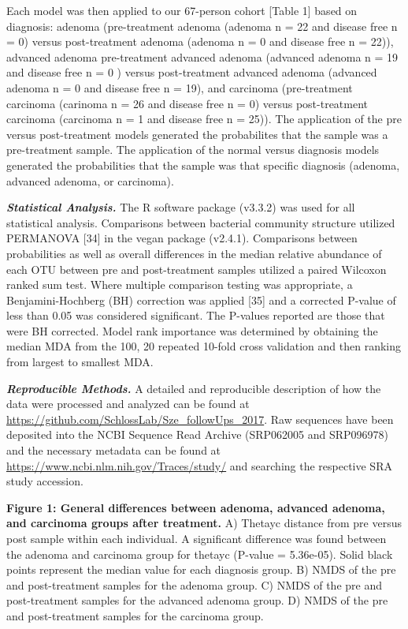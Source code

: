 \documentclass[12pt,]{article}
\begin{document}
Each model was then applied to our 67-person cohort {[}Table 1{]} based
on diagnosis: adenoma (pre-treatment adenoma (adenoma n = 22 and disease
free n = 0) versus post-treatment adenoma (adenoma n = 0 and disease
free n = 22)), advanced adenoma pre-treatment advanced adenoma (advanced
adenoma n = 19 and disease free n = 0 ) versus post-treatment advanced
adenoma (advanced adenoma n = 0 and disease free n = 19), and carcinoma
(pre-treatment carcinoma (carinoma n = 26 and disease free n = 0) versus
post-treatment carcinoma (carcinoma n = 1 and disease free n = 25)). The
application of the pre versus post-treatment models generated the
probabilites that the sample was a pre-treatment sample. The application
of the normal versus diagnosis models generated the probabilities that
the sample was that specific diagnosis (adenoma, advanced adenoma, or
carcinoma).

\textbf{\emph{Statistical Analysis.}} The R software package (v3.3.2)
was used for all statistical analysis. Comparisons between bacterial
community structure utilized PERMANOVA {[}34{]} in the vegan package
(v2.4.1). Comparisons between probabilities as well as overall
differences in the median relative abundance of each OTU between pre and
post-treatment samples utilized a paired Wilcoxon ranked sum test. Where
multiple comparison testing was appropriate, a Benjamini-Hochberg (BH)
correction was applied {[}35{]} and a corrected P-value of less than
0.05 was considered significant. The P-values reported are those that
were BH corrected. Model rank importance was determined by obtaining the
median MDA from the 100, 20 repeated 10-fold cross validation and then
ranking from largest to smallest MDA.

\textbf{\emph{Reproducible Methods.}} A detailed and reproducible
description of how the data were processed and analyzed can be found at
\url{https://github.com/SchlossLab/Sze_followUps_2017}. Raw sequences
have been deposited into the NCBI Sequence Read Archive (SRP062005 and
SRP096978) and the necessary metadata can be found at
\url{https://www.ncbi.nlm.nih.gov/Traces/study/} and searching the
respective SRA study accession.

\newpage

\textbf{Figure 1: General differences between adenoma, advanced adenoma,
and carcinoma groups after treatment.} A) Thetayc distance from pre
versus post sample within each individual. A significant difference was
found between the adenoma and carcinoma group for thetayc (P-value =
5.36e-05). Solid black points represent the median value for each
diagnosis group. B) NMDS of the pre and post-treatment samples for the
adenoma group. C) NMDS of the pre and post-treatment samples for the
advanced adenoma group. D) NMDS of the pre and post-treatment samples
for the carcinoma group.
\end{document}
